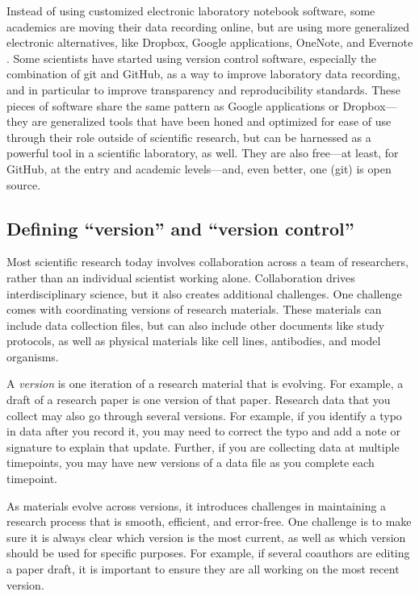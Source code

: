 \documentclass[]{tufte-book}
\begin{document}
Instead of using customized electronic laboratory notebook software, some
academics are moving their data recording online, but are using more generalized
electronic alternatives, like Dropbox, Google applications, OneNote, and
Evernote \citep{perkel2011coding, kwok2018lab, giles2012digital, powell2012lab}.
Some scientists have started using version control software, especially the
combination of git and GitHub, as a way to improve laboratory data recording,
and in particular to improve transparency and reproducibility standards.
These pieces of software share the same pattern as Google applications or
Dropbox---they are generalized tools that have been honed and optimized for ease
of use through their role outside of scientific research, but can be harnessed
as a powerful tool in a scientific laboratory, as well. They are also free---at
least, for GitHub, at the entry and academic levels---and, even better, one
(git) is open source.

\subsection{Defining ``version'' and ``version control''}\label{defining-version-and-version-control}

Most scientific research today involves collaboration across a team of
researchers, rather than an individual scientist working alone. Collaboration
drives interdisciplinary science, but it also creates additional challenges. One
challenge comes with coordinating versions of research materials. These
materials can include data collection files, but can also include other
documents like study protocols, as well as physical materials like cell lines,
antibodies, and model organisms.

A \emph{version} is one iteration of a research material that is evolving. For
example, a draft of a research paper is one version of that paper. Research data
that you collect may also go through several versions. For example, if you
identify a typo in data after you record it, you may need to correct the typo
and add a note or signature to explain that update. Further, if you are
collecting data at multiple timepoints, you may have new versions of a data file
as you complete each timepoint.

As materials evolve across versions, it introduces challenges in maintaining a
research process that is smooth, efficient, and error-free. One challenge is to
make sure it is always clear which version is the most current, as well as which
version should be used for specific purposes. For example, if several coauthors
are editing a paper draft, it is important to ensure they are all working on the
most recent version.
\end{document}
